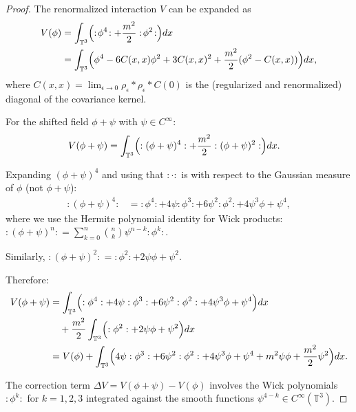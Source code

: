 \documentclass[12pt]{article}
\begin{document}
\begin{proof}
The renormalized interaction $V$ can be expanded as
\begin{align*}
V(\phi) &= \int_{\mathbb{T}^3} \Bigl(:\!\phi^4\!: + \frac{m^2}{2}:\!\phi^2\!:\Bigr) dx \\
&= \int_{\mathbb{T}^3} \Bigl(\phi^4 - 6C(x,x)\phi^2 + 3C(x,x)^2 + \frac{m^2}{2}(\phi^2 - C(x,x))\Bigr) dx,
\end{align*}
where $C(x,x) = \lim_{\epsilon \to 0} \rho_\epsilon * \rho_\epsilon * C(0)$ is the (regularized and renormalized) diagonal of the covariance kernel.

For the shifted field $\phi + \psi$ with $\psi \in C^\infty$:
\begin{align*}
V(\phi + \psi) &= \int_{\mathbb{T}^3} \Bigl(:(\phi+\psi)^4: + \frac{m^2}{2}:(\phi+\psi)^2:\Bigr) dx.
\end{align*}

Expanding $(\phi + \psi)^4$ and using that $:\cdot:$ is with respect to the Gaussian measure of $\phi$ (not $\phi+\psi$):
\begin{align*}
:(\phi + \psi)^4: &= :\phi^4: + 4\psi:\phi^3: + 6\psi^2:\phi^2: + 4\psi^3\phi + \psi^4,
\end{align*}
where we use the Hermite polynomial identity for Wick products: $:(\phi+\psi)^n: = \sum_{k=0}^n \binom{n}{k} \psi^{n-k}:\phi^k:$.

Similarly, $:(\phi+\psi)^2: = :\phi^2: + 2\psi\phi + \psi^2$.

Therefore:
\begin{align*}
V(\phi + \psi) &= \int_{\mathbb{T}^3} \Bigl(:\phi^4: + 4\psi:\phi^3: + 6\psi^2:\phi^2: + 4\psi^3\phi + \psi^4\Bigr) dx \\
&\quad + \frac{m^2}{2}\int_{\mathbb{T}^3} \Bigl(:\phi^2: + 2\psi\phi + \psi^2\Bigr) dx \\
&= V(\phi) + \int_{\mathbb{T}^3} \Bigl(4\psi:\phi^3: + 6\psi^2:\phi^2: + 4\psi^3\phi + \psi^4 + m^2\psi\phi + \frac{m^2}{2}\psi^2\Bigr) dx.
\end{align*}

The correction term $\Delta V = V(\phi+\psi) - V(\phi)$ involves the Wick polynomials $:\phi^k:$ for $k = 1, 2, 3$ integrated against the smooth functions $\psi^{4-k} \in C^\infty(\mathbb{T}^3)$.


\end{proof}
\end{document}
